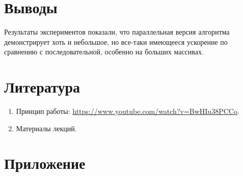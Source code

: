 \documentclass[12pt]{article}
\begin{document}
\newpage
\section*{Выводы}

Результаты экспериментов показали, что параллельная версия алгоритма демонстрирует хоть и небольшое, но все-таки имеющееся ускорение по сравнению с последовательной, особенно на больших массивах.

\newpage
\section*{Литература}

\begin{enumerate}
    \item Принцип работы: \url{https://www.youtube.com/watch?v=BwHIu38PCCo}.
    \item Материалы лекций.
\end{enumerate}

\newpage
\section*{Приложение}
\end{document}
